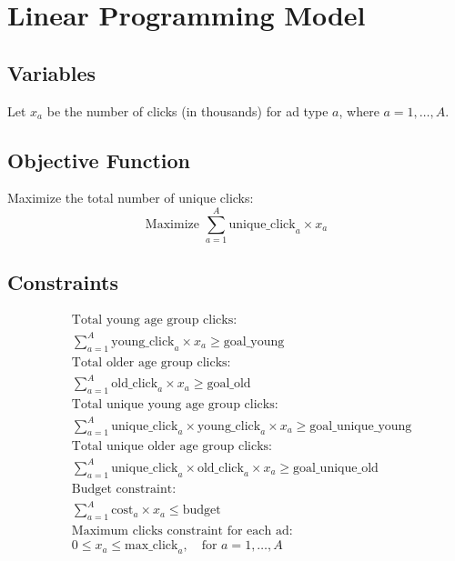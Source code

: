 \documentclass{article}
\begin{document}
\section*{Linear Programming Model}

\subsection*{Variables}
Let \( x_a \) be the number of clicks (in thousands) for ad type \( a \), where \( a = 1, \ldots, A \).

\subsection*{Objective Function}
Maximize the total number of unique clicks:
\[
\text{Maximize } \sum_{a=1}^{A} \text{unique\_click}_{a} \times x_a
\]

\subsection*{Constraints}
\begin{align*}
& \text{Total young age group clicks:} \\
& \sum_{a=1}^{A} \text{young\_click}_{a} \times x_a \geq \text{goal\_young} \\

& \text{Total older age group clicks:} \\
& \sum_{a=1}^{A} \text{old\_click}_{a} \times x_a \geq \text{goal\_old} \\

& \text{Total unique young age group clicks:} \\
& \sum_{a=1}^{A} \text{unique\_click}_{a} \times \text{young\_click}_{a} \times x_a \geq \text{goal\_unique\_young} \\

& \text{Total unique older age group clicks:} \\
& \sum_{a=1}^{A} \text{unique\_click}_{a} \times \text{old\_click}_{a} \times x_a \geq \text{goal\_unique\_old} \\

& \text{Budget constraint:} \\
& \sum_{a=1}^{A} \text{cost}_{a} \times x_a \leq \text{budget} \\

& \text{Maximum clicks constraint for each ad:} \\
& 0 \leq x_a \leq \text{max\_click}_{a}, \quad \text{for } a = 1, \ldots, A
\end{align*}
\end{document}
